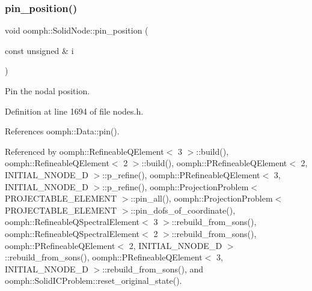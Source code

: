 \subsubsection{\texorpdfstring{pin\+\_\+position()}{pin\_position()}\hspace{0.1cm}{\footnotesize\ttfamily [1/2]}}
{\footnotesize\ttfamily void oomph\+::\+Solid\+Node\+::pin\+\_\+position (\begin{DoxyParamCaption}\item[{const unsigned \&}]{i }\end{DoxyParamCaption})\hspace{0.3cm}{\ttfamily [inline]}}



Pin the nodal position. 



Definition at line 1694 of file nodes.\+h.



References oomph\+::\+Data\+::pin().



Referenced by oomph\+::\+Refineable\+Q\+Element$<$ 3 $>$\+::build(), oomph\+::\+Refineable\+Q\+Element$<$ 2 $>$\+::build(), oomph\+::\+P\+Refineable\+Q\+Element$<$ 2, I\+N\+I\+T\+I\+A\+L\+\_\+\+N\+N\+O\+D\+E\+\_\+D $>$\+::p\+\_\+refine(), oomph\+::\+P\+Refineable\+Q\+Element$<$ 3, I\+N\+I\+T\+I\+A\+L\+\_\+\+N\+N\+O\+D\+E\+\_\+D $>$\+::p\+\_\+refine(), oomph\+::\+Projection\+Problem$<$ P\+R\+O\+J\+E\+C\+T\+A\+B\+L\+E\+\_\+\+E\+L\+E\+M\+E\+N\+T $>$\+::pin\+\_\+all(), oomph\+::\+Projection\+Problem$<$ P\+R\+O\+J\+E\+C\+T\+A\+B\+L\+E\+\_\+\+E\+L\+E\+M\+E\+N\+T $>$\+::pin\+\_\+dofs\+\_\+of\+\_\+coordinate(), oomph\+::\+Refineable\+Q\+Spectral\+Element$<$ 3 $>$\+::rebuild\+\_\+from\+\_\+sons(), oomph\+::\+Refineable\+Q\+Spectral\+Element$<$ 2 $>$\+::rebuild\+\_\+from\+\_\+sons(), oomph\+::\+P\+Refineable\+Q\+Element$<$ 2, I\+N\+I\+T\+I\+A\+L\+\_\+\+N\+N\+O\+D\+E\+\_\+D $>$\+::rebuild\+\_\+from\+\_\+sons(), oomph\+::\+P\+Refineable\+Q\+Element$<$ 3, I\+N\+I\+T\+I\+A\+L\+\_\+\+N\+N\+O\+D\+E\+\_\+D $>$\+::rebuild\+\_\+from\+\_\+sons(), and oomph\+::\+Solid\+I\+C\+Problem\+::reset\+\_\+original\+\_\+state().

\mbox{\label{classoomph_1_1SolidNode_ad4fefc1c7f3bb6f17ab39ce934bddaf6}} 
